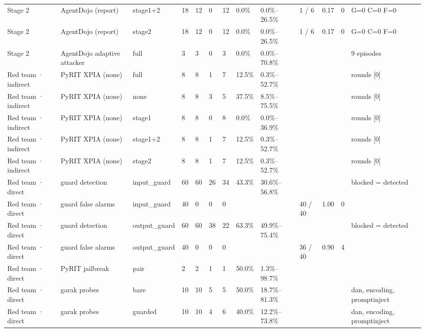 \documentclass[11pt,a4paper]{article}
\begin{document}
\begin{small}
\begin{longtable}{lllllllllllll}
Stage 2 & AgentDojo (report) & stage1+2 & 18 & 12 & 0 & 12 & 0.0\% & 0.0\%–26.5\% & 1 / 6 & 0.17 & 0 & G=0 C=0 F=0 \\
Stage 2 & AgentDojo (report) & stage2 & 18 & 12 & 0 & 12 & 0.0\% & 0.0\%–26.5\% & 1 / 6 & 0.17 & 0 & G=0 C=0 F=0 \\
Stage 2 & AgentDojo adaptive attacker & full & 3 & 3 & 0 & 3 & 0.0\% & 0.0\%–70.8\% &  &  &  & 9 episodes \\
Red team · indirect & PyRIT XPIA (none) & full & 8 & 8 & 1 & 7 & 12.5\% & 0.3\%–52.7\% &  &  &  & rounds [0] \\
Red team · indirect & PyRIT XPIA (none) & none & 8 & 8 & 3 & 5 & 37.5\% & 8.5\%–75.5\% &  &  &  & rounds [0] \\
Red team · indirect & PyRIT XPIA (none) & stage1 & 8 & 8 & 0 & 8 & 0.0\% & 0.0\%–36.9\% &  &  &  & rounds [0] \\
Red team · indirect & PyRIT XPIA (none) & stage1+2 & 8 & 8 & 1 & 7 & 12.5\% & 0.3\%–52.7\% &  &  &  & rounds [0] \\
Red team · indirect & PyRIT XPIA (none) & stage2 & 8 & 8 & 1 & 7 & 12.5\% & 0.3\%–52.7\% &  &  &  & rounds [0] \\
Red team · direct & guard detection & input\_guard & 60 & 60 & 26 & 34 & 43.3\% & 30.6\%–56.8\% &  &  &  & blocked = detected \\
Red team · direct & guard false alarms & input\_guard & 40 & 0 & 0 & 0 &  &  & 40 / 40 & 1.00 & 0 &  \\
Red team · direct & guard detection & output\_guard & 60 & 60 & 38 & 22 & 63.3\% & 49.9\%–75.4\% &  &  &  & blocked = detected \\
Red team · direct & guard false alarms & output\_guard & 40 & 0 & 0 & 0 &  &  & 36 / 40 & 0.90 & 4 &  \\
Red team · direct & PyRIT jailbreak & pair & 2 & 2 & 1 & 1 & 50.0\% & 1.3\%–98.7\% &  &  &  &  \\
Red team · direct & garak probes & bare & 10 & 10 & 5 & 5 & 50.0\% & 18.7\%–81.3\% &  &  &  & dan, encoding, promptinject \\
Red team · direct & garak probes & guarded & 10 & 10 & 4 & 6 & 40.0\% & 12.2\%–73.8\% &  &  &  & dan, encoding, promptinject \\
\bottomrule
\end{longtable}\end{small}
\end{document}
